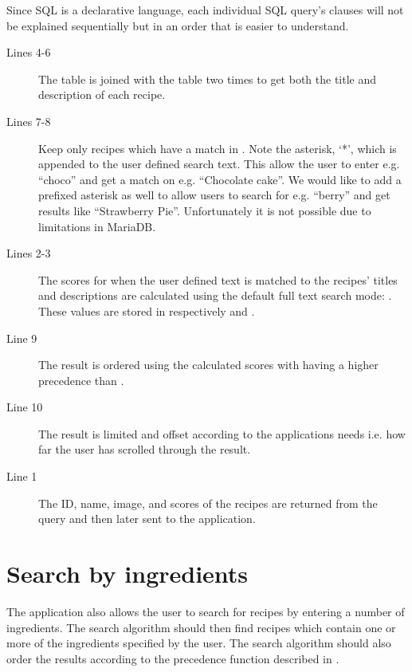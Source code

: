 Since SQL is a declarative language, each individual SQL query's clauses will not be explained sequentially but in an order that is easier to understand.
\begin{description}
\item[Lines 4-6] The  table is joined with the  table two times to get both the title and description of each recipe.
\item[Lines 7-8] Keep only recipes which have a match in . Note the asterisk, `*', which is appended to the user defined search text. This allow the user to enter e.g. ``choco'' and get a match on e.g. ``Chocolate cake''. We would like to add a prefixed asterisk as well to allow users to search for e.g. ``berry'' and get results like ``Strawberry Pie''. Unfortunately it is not possible due to limitations in MariaDB.\cite{mariafulltext}
\item[Lines 2-3] The scores for when the user defined text is matched to the recipes' titles and descriptions are calculated using the default full text search mode: . These values are stored in respectively  and . 
\item[Line 9] The result is ordered using the calculated scores with  having a higher precedence than .
\item[Line 10] The result is limited and offset according to the applications needs i.e. how far the user has scrolled through the result.
\item[Line 1] The ID, name, image, and scores of the recipes are returned from the query and then later sent to the application.
\end{description}



\section{Search by ingredients}
The application also allows the user to search for recipes by entering a number of ingredients. The search algorithm should then find recipes which contain one or more of the ingredients specified by the user. The search algorithm should also order the results according to the precedence function described in .

